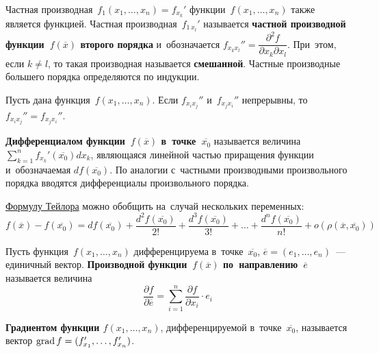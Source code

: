 Частная производная~$f_1(x_1, \ldots, x_n) = f_{x_k}'$ функции~$f(x_1, \ldots, x_n)$ также является функцией.
Частная производная~$f_{1\, x_l}'$ называется \textbf{частной производной функции~$f(\overline x)$ второго порядка} и~обозначается $f_{x_k x_l}'' = \dfrac{\partial^2 f}{\partial x_k \partial x_l}$.
При~этом, если $k \neq l$, то такая производная называется \textbf{смешанной}.
Частные производные большего порядка определяются по индукции.

\begin{theorem}[Шварца]
Пусть дана функция~$f(x_1, \ldots, x_n)$.
Если $f_{x_i x_j}''$ и~$f_{x_j x_i}''$ непрерывны, то $f_{x_i x_j}'' = f_{x_j x_i}''$.
\end{theorem}

\textbf{Дифференциалом функции~$f(\overline x)$ в~точке~$\overline{x_0}$} называется величина $\displaystyle \sum_{k=1}^n f_{x_k}'(\overline{x_0}) dx_k$, являющаяся линейной частью приращения функции и~обозначаемая $df(\overline{x_0})$.
По аналогии с~частными производными произвольного порядка вводятся дифференциалы произвольного порядка.

\hyperref[th:Taylor's_formula]{Формулу Тейлора} можно обобщить на~случай нескольких переменных:
\begin{equation*}
f(\overline x) - f(\overline{x_0}) =
df(\overline{x_0}) + \frac{d^2 f(\overline{x_0})}{2!} + \frac{d^3 f(\overline{x_0})}{3!} + \ldots + \frac{d^n f(\overline{x_0})}{n!} + o(\rho(\overline x, \overline{x_0}))
\end{equation*}

 Пусть функция~$f(x_1, \ldots, x_n)$ дифференцируема в~точке~$\overline{x_0}$, $\overline e = (e_1, \ldots, e_n)$~--- единичный вектор.
\textbf{Производной функции~$f(\overline x)$ по~направлению~$\overline e$} называется величина
\begin{equation*}
\frac{\partial f}{\partial \overline e} = \sum_{i=1}^n \frac{\partial f}{\partial x_i} \cdot e_i
\end{equation*}

 \textbf{Градиентом функции $f(x_1, \ldots, x_n)$}, дифференцируемой в~точке~$\overline{x_0}$, называется вектор $\grad f \opbr= (f_{x_1}', \ldots, f_{x_n}')$.